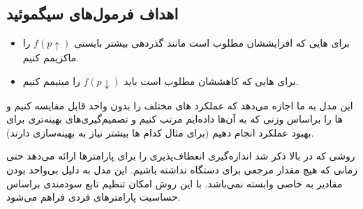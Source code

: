\documentclass[a4paper]{article}
\begin{document}
\subsection{اهداف فرمول‌های سیگموئید}

\begin{itemize}
    \item برای هایی که افزایششان مطلوب است مانند گذردهی بیشتر بایستی
    $f(p \uparrow)$ را ماکزیمم کنیم.
    \item برای هایی که کاهششان مطلوب است باید $f(p \downarrow)$ را
    مینیمم کنیم.
\end{itemize}

این مدل به ما اجازه می‌دهد که عملکرد های مختلف را بدون واحد قابل مقایسه
کنیم و ها را براساس وزنی که به آن‌ها داده‌ایم مرتب کنیم و تصمیم‌گیری‌های
بهینه‌تری برای بهبود عملکرد  انجام دهیم (برای مثال کدام ها بیشتر
نیاز به بهینه‌سازی دارند).

روشی که در بالا ذکر شد اندازه‌گیری انعطاف‌پذیری را برای پارامتر‌ها ارائه می‌دهد
حتی زمانی که هیچ مقدار مرجعی برای دستگاه  نداشته باشیم. این مدل به دلیل
بی‌واحد بودن مقادیر به  خاصی وابسته نمی‌باشد. با این روش امکان تنظیم
تابع سودمندی براساس حساسیت پارامتر‌های فردی فراهم می‌شود.

\newpage


\end{document}
